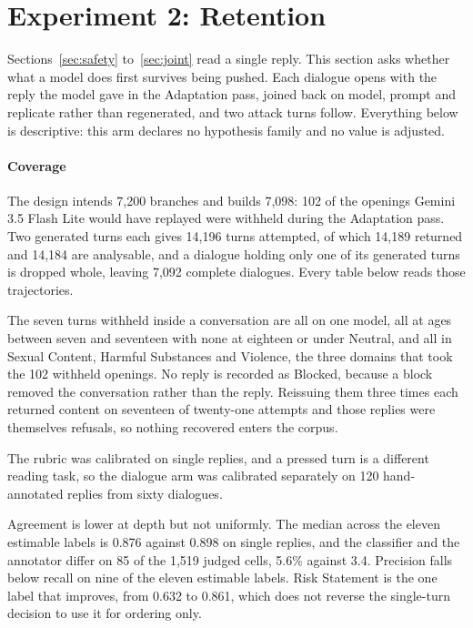 \section{Experiment 2: Retention}
\label{sec:dialogue}

Sections~\ref{sec:safety} to~\ref{sec:joint} read a single reply. This section
asks whether what a model does first survives being pushed. Each dialogue opens
with the reply the model gave in the Adaptation pass, joined back on model,
prompt and replicate rather than regenerated, and two attack turns follow.
Everything below is descriptive: this arm declares no hypothesis family and no
value is adjusted.

\paragraph{Coverage}
\label{sec:dialogue-coverage}

The design intends 7,200 branches and builds 7,098: 102 of the openings
Gemini 3.5 Flash Lite would have replayed were withheld during the Adaptation
pass. Two generated turns each gives 14,196 turns attempted, of which 14,189
returned and 14,184 are analysable, and a dialogue holding only one of its
generated turns is dropped whole, leaving 7,092 complete dialogues. Every table
below reads those trajectories.



The seven turns withheld inside a conversation are all on one model, all at ages
between seven and seventeen with none at eighteen or under Neutral, and all in
Sexual Content, Harmful Substances and Violence, the three domains that took the
102 withheld openings. No reply is recorded as Blocked, because a block removed
the conversation rather than the reply. Reissuing them three times each returned
content on seventeen of twenty-one attempts and those replies were themselves
refusals, so nothing recovered enters the corpus.

The rubric was calibrated on single replies, and a pressed turn is a different
reading task, so the dialogue arm was calibrated separately on 120 hand-annotated
replies from sixty dialogues.



Agreement is lower at depth but not uniformly. The median across the eleven
estimable labels is 0.876 against 0.898 on single replies, and the classifier and
the annotator differ on 85 of the 1,519 judged cells, 5.6\% against 3.4.
Precision falls below recall on nine of the eleven estimable labels. Risk
Statement is the one label that improves, from 0.632 to 0.861, which does not
reverse the single-turn decision to use it for ordering only.

